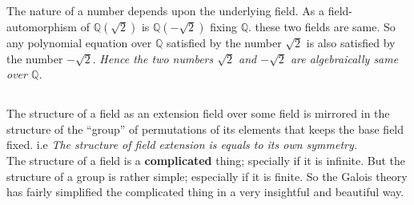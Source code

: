 \subsection{}
The nature of a number depends upon the underlying field. As a field-automorphism of  \(\mathbb{Q}(\sqrt{2})\) is \(\mathbb{Q}(-\sqrt{2})\) fixing \(\mathbb{Q}\). these two fields are same. So any polynomial equation over \(\mathbb{Q}\) satisfied by the number \(\sqrt{2}\) is also satisfied by the number \(-\sqrt{2}\). \textit{Hence the two numbers \(\sqrt{2}\) and \(-\sqrt{2}\) are algebraically same over \(\mathbb{Q}\).}\\

\subsection{}
The structure of a field as an extension field over some field is mirrored in the structure of the ``group'' of  permutations of its elements that keeps the base field fixed. i.e \textit{The structure of field extension is equals to its own symmetry.}\\

The structure of a field is a \textbf{complicated} thing; specially if it is infinite. But the structure of a group is rather simple; especially if it is finite. So the Galois theory has fairly simplified the complicated thing in a very insightful and beautiful way.\\

